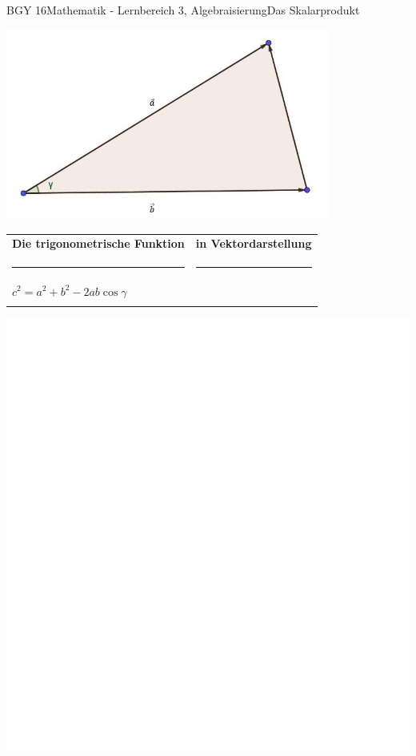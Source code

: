 \documentclass[oneside,openany,headings=optiontotoc,11pt,numbers=noenddot]{scrreprt}
\begin{document}
	\begin{worksheet}{BGY 16}{Mathematik - Lernbereich 3, Algebraisierung}{Das Skalarprodukt}
				
		\begin{framed}
			\noindent
			\begin{center}
				\includegraphics[width=0.8\textwidth]{Bilder/Dreieck.jpg}\\
			\end{center}
			\begin{framed}
				\noindent
				\begin{tabularx}{\textwidth}{X|X}
					\textbf{Die trigonometrische Funktion} & \textbf{in Vektordarstellung}\\
					\hrule & \hrule\\
					\( c^{2} = a^{2} + b^{2} - 2ab\cos{\gamma}\)&\\
					\mbox{} & \\
				\end{tabularx}
			\end{framed}
		\end{framed}
		\begin{framed}
			\includegraphics[height=0.4\textheight]{../empty.jpg}\\

\end{framed}
\end{worksheet}
\end{document}
